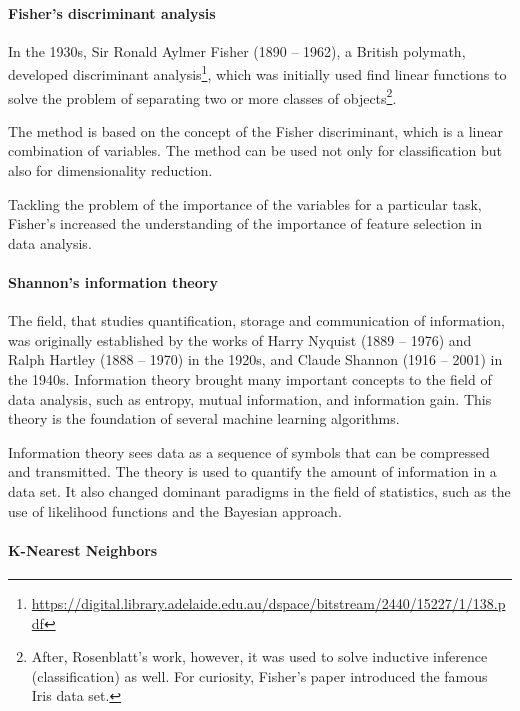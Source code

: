 \paragraph{Fisher's discriminant analysis}

In the 1930s, Sir Ronald Aylmer Fisher (1890 -- 1962), a British polymath, developed
discriminant analysis\footnote{\url{https://digital.library.adelaide.edu.au/dspace/bitstream/2440/15227/1/138.pdf}},
which was initially used find linear functions to solve the problem of separating two or
more classes of objects\footnote{After, Rosenblatt's work, however, it was used to solve
inductive inference (classification) as well.  For curiosity, Fisher's paper
introduced the famous Iris data set.}.

The method is based on the concept of the Fisher discriminant, which is a linear
combination of variables.  The method can be used not only for classification but also for
dimensionality reduction.

Tackling the problem of the importance of the variables for a particular task, Fisher's
increased the understanding of the importance of feature selection in data analysis.


\paragraph{Shannon's information theory}

The field, that studies quantification, storage and communication of information, was
originally established by the works of Harry Nyquist (1889 -- 1976) and Ralph Hartley
(1888 -- 1970) in the 1920s, and Claude Shannon (1916 -- 2001) in the 1940s.
Information theory brought many important concepts to the field of data analysis, such as
entropy, mutual information, and information gain.  This theory is the foundation of
several machine learning algorithms.

Information theory sees data as a sequence of symbols that can be compressed and
transmitted.  The theory is used to quantify the amount of information in a data set.
It also changed dominant paradigms in the field of statistics, such as the use of
likelihood functions and the Bayesian approach.


\paragraph{K-Nearest Neighbors}

